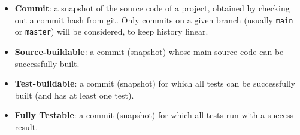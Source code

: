 
\begin{itemize}
\item \textbf{Commit}: a snapshot of the source code of a project, obtained by checking out a commit hash from git. Only commits on a given branch (usually \texttt{main} or \texttt{master}) will be considered, to keep history linear.
\item \textbf{Source-buildable}: a commit (snapshot) whose main source code can be successfully built. 
\item \textbf{Test-buildable}: a commit (snapshot) for which all tests can be successfully built (and has at least one test).
\item \textbf{Fully Testable}: a commit (snapshot) for which all tests run with a success result.

\end{itemize}

